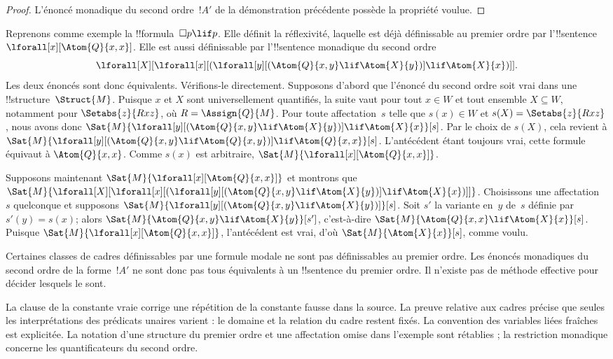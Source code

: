 \documentclass[../../../include/open-logic-section]{subfiles}
\begin{document}
\begin{proof}
  L'énoncé monadique du second ordre~$!A'$ de la démonstration
  précédente possède la propriété voulue.
\end{proof}

Reprenons comme exemple la !!{formula}~$\Box p \lif p$. Elle définit
la réflexivité, laquelle est déjà définissable au premier ordre par
l'!!{sentence}~$\lforall[x][\Atom{Q}{x,x}]$. Elle est aussi
définissable par l'!!{sentence} monadique du second ordre
\[
\lforall[X][\lforall[x][(\lforall[y][(\Atom{Q}{x,y} \lif \Atom{X}{y})]
    \lif \Atom{X}{x})]].
\]
Les deux énoncés sont donc équivalents. Vérifions-le directement.
Supposons d'abord que l'énoncé du second ordre soit vrai dans une
!!{structure}~$\Struct{M}$. Puisque $x$ et $X$ sont universellement
quantifiés, la suite vaut pour tout $x \in W$ et tout ensemble
$X \subseteq W$, notamment pour $\Setabs{z}{Rxz}$, où
$R = \Assign{Q}{M}$. Pour toute affectation~$s$ telle que
$s(x) \in W$ et $s(X) = \Setabs{z}{Rxz}$, nous avons donc
$\Sat{M}{\lforall[y][(\Atom{Q}{x,y} \lif
    \Atom{X}{y})] \lif \Atom{X}{x}}[s]$. Par le choix de $s(X)$,
cela revient à
$\Sat{M}{\lforall[y][(\Atom{Q}{x,y} \lif
    \Atom{Q}{x,y})] \lif \Atom{Q}{x,x}}[s]$.
L'antécédent étant toujours vrai, cette formule équivaut à
$\Atom{Q}{x,x}$. Comme $s(x)$ est arbitraire,
$\Sat{M}{\lforall[x][\Atom{Q}{x,x}]}$.

Supposons maintenant $\Sat{M}{\lforall[x][\Atom{Q}{x,x}]}$ et
montrons que
$\Sat{M}{\lforall[X][\lforall[x][(\lforall[y][(\Atom{Q}{x,y} \lif
        \Atom{X}{y})] \lif \Atom{X}{x})]]}$. Choisissons une
affectation~$s$ quelconque et supposons
$\Sat{M}{\lforall[y][(\Atom{Q}{x,y} \lif
    \Atom{X}{y})]}[s]$. Soit $s'$ la variante en~$y$ de~$s$
définie par $s'(y) = s(x)$; alors
$\Sat{M}{\Atom{Q}{x,y} \lif \Atom{X}{y}}[s']$, c'est-à-dire
$\Sat{M}{\Atom{Q}{x,x} \lif \Atom{X}{x}}[s]$. Puisque
$\Sat{M}{\lforall[x][\Atom{Q}{x,x}]}$, l'antécédent est vrai, d'où
$\Sat{M}{\Atom{X}{x}}[s]$, comme voulu.

Certaines classes de cadres définissables par une formule modale ne
sont pas définissables au premier ordre. Les énoncés monadiques du
second ordre de la forme~$!A'$ ne sont donc pas tous équivalents à un
!!{sentence} du premier ordre. Il n'existe pas de méthode effective
pour décider lesquels le sont.
\begin{editorial}La clause de la constante vraie corrige une répétition de la constante fausse dans la source. La preuve relative aux cadres précise que seules les interprétations des prédicats unaires varient : le domaine et la relation du cadre restent fixés. La convention des variables liées fraîches est explicitée. La notation d’une structure du premier ordre et une affectation omise dans l’exemple sont rétablies ; la restriction monadique concerne les quantificateurs du second ordre.\end{editorial}
\end{document}
